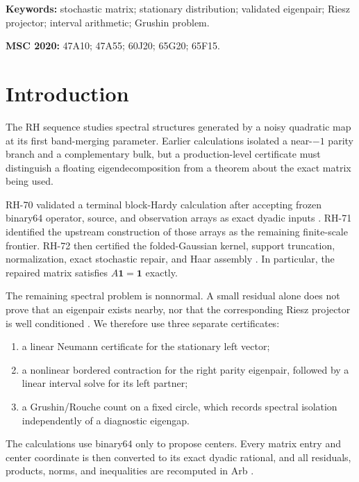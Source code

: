 \documentclass[11pt]{article}
\theoremstyle{definition}
\newcommand{\one}{\mathbf 1}
\begin{document}
\noindent\textbf{Keywords:} stochastic matrix; stationary distribution;
validated eigenpair; Riesz projector; interval arithmetic; Grushin problem.

\medskip
\noindent\textbf{MSC 2020:} 47A10; 47A55; 60J20; 65G20; 65F15.

\section{Introduction}

The RH sequence studies spectral structures generated by a noisy quadratic
map at its first band-merging parameter.  Earlier calculations isolated a
near-$-1$ parity branch and a complementary bulk, but a production-level
certificate must distinguish a floating eigendecomposition from a theorem
about the exact matrix being used.

RH-70 validated a terminal block-Hardy calculation after accepting frozen
binary64 operator, source, and observation arrays as exact dyadic inputs
\citep{WangFrozen2026}.  RH-71 identified the upstream construction of those
arrays as the remaining finite-scale frontier.  RH-72 then certified the
folded-Gaussian kernel, support truncation, normalization, exact stochastic
repair, and Haar assembly \citep{WangAssembly2026}.  In particular, the
repaired matrix satisfies $A\one=\one$ exactly.

The remaining spectral problem is nonnormal.  A small residual alone does not
prove that an eigenpair exists nearby, nor that the corresponding Riesz
projector is well conditioned \citep{Kato1995,Higham2002}.  We therefore use
three separate certificates:

\begin{enumerate}[leftmargin=2.2em]
 \item a linear Neumann certificate for the stationary left vector;
 \item a nonlinear bordered contraction for the right parity eigenpair,
       followed by a linear interval solve for its left partner;
 \item a Grushin/Rouche count on a fixed circle, which records spectral
       isolation independently of a diagnostic eigengap.
\end{enumerate}

The calculations use binary64 only to propose centers.  Every matrix entry and
center coordinate is then converted to its exact dyadic rational, and all
residuals, products, norms, and inequalities are recomputed in Arb
\citep{Johansson2017,Rump2010}.
\end{document}
